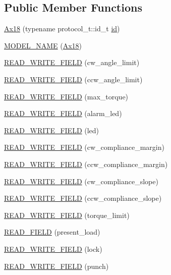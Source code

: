 \subsection*{Public Member Functions}
\begin{DoxyCompactItemize}
\item 
\hyperlink{classdynamixel_1_1servos_1_1_ax18_a58ee7bed2bf246c1a8bb7557b2b05cab}{Ax18} (typename protocol\+\_\+t\+::id\+\_\+t \hyperlink{classdynamixel_1_1servos_1_1_servo_a2d022081672e25a7bb57b76706e1cc57}{id})
\item 
\hyperlink{classdynamixel_1_1servos_1_1_ax18_a589278d427bfc731a8c5793be1b74fab}{M\+O\+D\+E\+L\+\_\+\+N\+A\+ME} (\hyperlink{classdynamixel_1_1servos_1_1_ax18}{Ax18})
\item 
\hyperlink{classdynamixel_1_1servos_1_1_ax18_a8a040ce8c16f94f55cbe148bd51faf2d}{R\+E\+A\+D\+\_\+\+W\+R\+I\+T\+E\+\_\+\+F\+I\+E\+LD} (cw\+\_\+angle\+\_\+limit)
\item 
\hyperlink{classdynamixel_1_1servos_1_1_ax18_a391b42df8bc701172c77c0176222e280}{R\+E\+A\+D\+\_\+\+W\+R\+I\+T\+E\+\_\+\+F\+I\+E\+LD} (ccw\+\_\+angle\+\_\+limit)
\item 
\hyperlink{classdynamixel_1_1servos_1_1_ax18_a678f214d64496523b40f4cbada31eda0}{R\+E\+A\+D\+\_\+\+W\+R\+I\+T\+E\+\_\+\+F\+I\+E\+LD} (max\+\_\+torque)
\item 
\hyperlink{classdynamixel_1_1servos_1_1_ax18_a367cf2bdc9a1101d8b72801b00db1bfc}{R\+E\+A\+D\+\_\+\+W\+R\+I\+T\+E\+\_\+\+F\+I\+E\+LD} (alarm\+\_\+led)
\item 
\hyperlink{classdynamixel_1_1servos_1_1_ax18_a55cf3996e099be27a82db1eb8add0c1b}{R\+E\+A\+D\+\_\+\+W\+R\+I\+T\+E\+\_\+\+F\+I\+E\+LD} (led)
\item 
\hyperlink{classdynamixel_1_1servos_1_1_ax18_a1e33e9e9216ab84479446c7453bd9393}{R\+E\+A\+D\+\_\+\+W\+R\+I\+T\+E\+\_\+\+F\+I\+E\+LD} (cw\+\_\+compliance\+\_\+margin)
\item 
\hyperlink{classdynamixel_1_1servos_1_1_ax18_acc0dbe2e32af3fd0e2f3a06f8f2cf6d0}{R\+E\+A\+D\+\_\+\+W\+R\+I\+T\+E\+\_\+\+F\+I\+E\+LD} (ccw\+\_\+compliance\+\_\+margin)
\item 
\hyperlink{classdynamixel_1_1servos_1_1_ax18_a1a98ea1bb1082cc07766a631934d9fa8}{R\+E\+A\+D\+\_\+\+W\+R\+I\+T\+E\+\_\+\+F\+I\+E\+LD} (cw\+\_\+compliance\+\_\+slope)
\item 
\hyperlink{classdynamixel_1_1servos_1_1_ax18_a01def36bc91208ebf98ca9d2a1e856c2}{R\+E\+A\+D\+\_\+\+W\+R\+I\+T\+E\+\_\+\+F\+I\+E\+LD} (ccw\+\_\+compliance\+\_\+slope)
\item 
\hyperlink{classdynamixel_1_1servos_1_1_ax18_a69b85222cbb7dd8644df963f518bbac3}{R\+E\+A\+D\+\_\+\+W\+R\+I\+T\+E\+\_\+\+F\+I\+E\+LD} (torque\+\_\+limit)
\item 
\hyperlink{classdynamixel_1_1servos_1_1_ax18_ae9a10a2df0bfa9d00705be3c724cc95a}{R\+E\+A\+D\+\_\+\+F\+I\+E\+LD} (present\+\_\+load)
\item 
\hyperlink{classdynamixel_1_1servos_1_1_ax18_a21cc820e2dc1cff3b6431a9a5da203f7}{R\+E\+A\+D\+\_\+\+W\+R\+I\+T\+E\+\_\+\+F\+I\+E\+LD} (lock)
\item 
\hyperlink{classdynamixel_1_1servos_1_1_ax18_a3e0041dc4802f1127a1cbd898f0f5256}{R\+E\+A\+D\+\_\+\+W\+R\+I\+T\+E\+\_\+\+F\+I\+E\+LD} (punch)
\end{DoxyCompactItemize}
